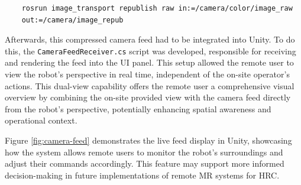 \begin{verbatim} 
    rosrun image_transport republish raw in:=/camera/color/image_raw 
    out:=/camera/image_repub 
\end{verbatim}

Afterwards, this compressed camera feed had to be integrated into Unity. To do this, the \texttt{CameraFeedReceiver.cs} script was developed, responsible for receiving and rendering the feed into the \ac{UI} panel. This setup allowed the remote user to view the robot’s perspective in real time, independent of the on-site operator’s actions. This dual-view capability offers the remote user a comprehensive visual overview by combining the on-site provided view with the camera feed directly from the robot’s perspective, potentially enhancing spatial awareness and operational context.

Figure \ref{fig:camera-feed} demonstrates the live feed display in Unity, showcasing how the system allows remote users to monitor the robot’s surroundings and adjust their commands accordingly. This feature may support more informed decision-making in future implementations of remote \ac{MR} systems for \ac{HRC}.


